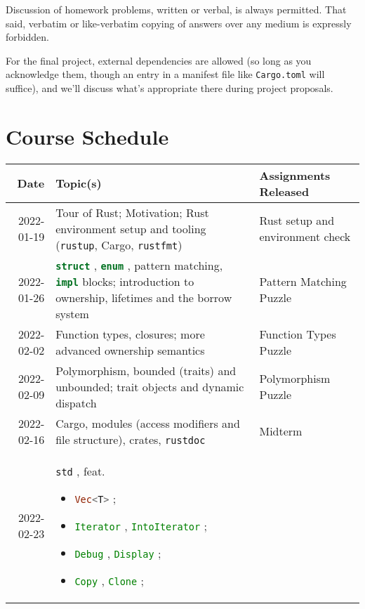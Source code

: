 \documentclass{article}
\newcommand{\code}[2][]{{\sloppy
\ifmmode
\text{\lstinline[language=rust,#1]`#2`}
\else
{\lstinline[language=rust,#1]`#2`}%
\fi}}
\begin{document}
Discussion of homework problems, written or verbal, is always permitted. That
said, verbatim or like-verbatim copying of answers over any medium is expressly
forbidden.

For the final project, external dependencies are allowed (so long as you
acknowledge them, though an entry in a manifest file like \texttt{Cargo.toml}
will suffice), and we'll discuss what's appropriate there during project
proposals.

\section*{Course Schedule}

\begin{longtable}{rp{}@{\hskip .05\textwidth}p{}}
    Date        & Topic(s)                          & Assignments Released  \\
    \toprule
    2022-01-19  & Tour of Rust; Motivation; Rust environment setup and tooling
                 (\texttt{rustup}, Cargo, \texttt{rustfmt})
                & Rust setup and environment check                          \\
    2022-01-26  & \code{struct}, \code{enum}, pattern matching, \code{impl}
                  blocks; introduction to ownership, lifetimes and the borrow
                  system
                & Pattern Matching Puzzle                                   \\
    2022-02-02  & Function types, closures; more advanced ownership semantics
                & Function Types Puzzle                                     \\
    2022-02-09  & Polymorphism, bounded (traits) and unbounded; trait objects
                  and dynamic dispatch
                & Polymorphism Puzzle                                       \\
    2022-02-16  & Cargo, modules (access modifiers and file structure),
                 crates, \texttt{rustdoc}
                & Midterm                                                   \\
    2022-02-23  & \code{std}, feat. \begin{itemize}
                        \item \code{Vec<T>};
                        \item \code{Iterator}, \code{IntoIterator};
                        \item \code{Debug}, \code{Display};
                        \item \code{Copy}, \code{Clone};

\end{itemize}
\end{longtable}
\end{document}
